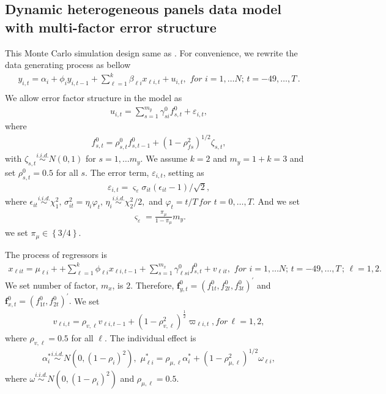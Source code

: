 \documentclass[12pt,a4paper,hyperref]{article}
\begin{document}
\subsection{Dynamic heterogeneous panels data model with multi-factor error structure}
This Monte Carlo simulation design same as \citet{Norkute:2019}.
For convenience, we rewrite the data generating process as bellow
\begin{align}
y_{i,t}=\alpha_{i}+\phi_{i} y_{i,t-1}+ \sum^{k}_{\ell=1}\beta_{\ell i}x_{\ell i,t}+u_{i,t}, \,\, for\,\,i=1,\ldots N;\,t=-49,\ldots,T\, . \\ \label{M1}
\end{align}
We allow error factor structure in the model as
\begin{align}
u_{i,t}=    \sum^{m_{y}}_{s=1}\gamma^{0}_{si}f^{0}_{s,t} +\varepsilon_{i,t},
\end{align}
where
\begin{align}
f^{0}_{s,t}=\rho^{0}_{s,t} f^{0}_{s,t-1}+\left( 1-\rho^{2}_{fs} \right)^{1/2}\zeta_{s,t},
\end{align}
with $\zeta_{s,t} \overset{i.i.d.}{\sim} N(0,1)$ for $s=1,\ldots m_{y}$. We assume $k=2$ and $m_{y}=1+k=3$ and set $\rho^{0}_{s,t}=0.5$ for all $s$. The error term, $\varepsilon_{i,t}$, setting as
\begin{align}
\varepsilon_{i,t}=\varsigma_{\varepsilon}\sigma_{it}\left(\epsilon_{it}-1 \right)/\sqrt{2},
\end{align}
where $ \epsilon_{it}\overset{i.i.d.}{\sim} \chi^{2}_{1},\, \sigma^{2}_{it}=\eta_{i}\varphi_{t}, \,\eta_{i}\overset{i.i.d.}{\sim}\chi^{2}_{2}/2,$  and  $\varphi_{t}=t/T\, for \,\, t=0,\ldots, T.$ And we set
\begin{align}
\varsigma_{\varepsilon}=\frac{\pi_{\mu}}{1-\pi_{\mu}}m_{y}.
\end{align}
we set $\pi_{\mu} \in \left\{ 3/4\right\}.$

The process of regressors is
\begin{align}
x_{\ell it}=\mu_{\ell i}++\sum^{k}_{\ell=1}\phi_{\ell i}x_{\ell i,t-1}+\sum^{m_{x}}_{s=1}\gamma^{0}_{\ell si}f^{0}_{s,t}+v_{\ell it}, \,\, for\,\,i=1,\ldots N;\,t=-49,\ldots,T\,; \, \ell=1,2.
\end{align}
We set number of factor, $m_{x}$, is $2$. Therefore, $\boldsymbol{f}^{0}_{y,t}=\left(f^{0}_{1t}, f^{0}_{2t},f^{0}_{3t}  \right)^{'}$ and $\boldsymbol{f}^{0}_{x,t}=\left(f^{0}_{1t}, f^{0}_{2t}  \right)^{'}.$
We set
\begin{align}
v_{\ell i,t}=\rho_{v, \ell}v_{\ell i,t-1}+\left( 1-\rho^{2}_{v, \ell} \right)^{\frac{1}{2}}\varpi_{\ell i,t},  for \, \ell=1,2,
\end{align}
  where $\rho_{v, \ell}=0.5$ for all $\ell$.
The individual effect is
\begin{align}
 \alpha^{\ast}_{i}\overset{i.i.d.}{\sim} N\left(0, (1-\rho_{i})^{2} \right), \,\, \mu^{\ast}_{\ell i}=\rho_{\mu,\ell}\alpha^{\ast}_{i}+\left( 1-\rho^{2}_{\mu,\ell} \right)^{1/2}\omega_{\ell i},
\end{align}
where $\omega \overset{i.i.d.}{\sim}N\left(0, (1-\rho_{i})^{2} \right)$ and $\rho_{\mu,\ell}=0.5$.
\end{document}
